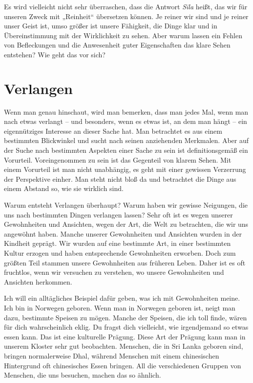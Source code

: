 \documentclass[12pt,openany]{book}
\begin{document}
Es wird vielleicht nicht sehr überraschen, dass die Antwort \textit{Sīla} heißt, das wir für unseren Zweck mit „Reinheit“ übersetzen können. Je reiner wir sind und je reiner unser Geist ist, umso größer ist unsere Fähigkeit, die Dinge klar und in Übereinstimmung mit der Wirklichkeit zu sehen. Aber warum lassen ein Fehlen von Befleckungen und die Anwesenheit guter Eigenschaften das klare Sehen entstehen? Wie geht das vor sich?

\section*{Verlangen}

Wenn man genau hinschaut, wird man bemerken, dass man jedes Mal, wenn man nach etwas verlangt – und besonders, wenn es etwas ist, an dem man hängt – ein eigennütziges Interesse an dieser Sache hat. Man betrachtet es aus einem bestimmten Blickwinkel und sucht nach seinen anziehenden Merkmalen. Aber auf der Suche nach bestimmten Aspekten einer Sache zu sein ist definitionsgemäß ein Vorurteil. Voreingenommen zu sein ist das Gegenteil von klarem Sehen. Mit einem Vorurteil ist man nicht unabhängig, es geht mit einer gewissen Verzerrung der Perspektive einher. Man steht nicht bloß da und betrachtet die Dinge aus einem Abstand so, wie sie wirklich sind.

Warum entsteht Verlangen überhaupt? Warum haben wir gewisse Neigungen, die uns nach bestimmten Dingen verlangen lassen? Sehr oft ist es wegen unserer Gewohnheiten und Ansichten, wegen der Art, die Welt zu betrachten, die wir uns angewöhnt haben. Manche unserer Gewohnheiten und Ansichten wurden in der Kindheit geprägt. Wir wurden auf eine bestimmte Art, in einer bestimmten Kultur erzogen und haben entsprechende Gewohnheiten erworben. Doch zum größten Teil stammen unsere Gewohnheiten aus früheren Leben. Daher ist es oft fruchtlos, wenn wir versuchen zu verstehen, wo unsere Gewohnheiten und Ansichten herkommen.

Ich will ein alltägliches Beispiel dafür geben, was ich mit Gewohnheiten meine. Ich bin in Norwegen geboren. Wenn man in Norwegen geboren ist, neigt man dazu, bestimmte Speisen zu mögen. Manche der Speisen, die ich toll finde, wären für dich wahrscheinlich eklig. Du fragst dich vielleicht, wie irgendjemand so etwas essen kann. Das ist eine kulturelle Prägung. Diese Art der Prägung kann man in unserem Kloster sehr gut beobachten. Menschen, die in Sri Lanka geboren sind, bringen normalerweise Dhal, während Menschen mit einem chinesischen Hintergrund oft chinesisches Essen bringen. All die verschiedenen Gruppen von Menschen, die uns besuchen, machen das so ähnlich.
\end{document}
